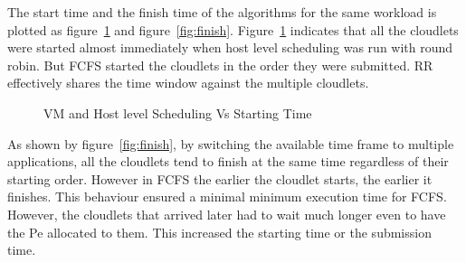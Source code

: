 \documentclass[times, 10pt,twocolumn]{article}
\begin{document}
The start time and the finish time of the algorithms for the same workload is plotted as figure~\ref{fig:start} and figure~\ref{fig:finish}. Figure~\ref{fig:start} indicates that all the cloudlets were started almost immediately when host level scheduling was run with round robin. But FCFS started the cloudlets in the order they were submitted. RR effectively shares the time window against the multiple cloudlets. 
\begin{figure}[ht]
 \caption{VM and Host level Scheduling Vs Starting Time}
 \label{fig:start}
\end{figure}

As shown by figure~\ref{fig:finish}, by switching the available time frame to multiple applications, all the cloudlets tend to finish at the same time regardless of their starting order. However in FCFS the earlier the cloudlet starts, the earlier it finishes. This behaviour ensured a minimal minimum execution time for FCFS. However, the cloudlets that arrived later had to wait much longer even to have the Pe allocated to them. This increased the starting time or the submission time. 
\end{document}
